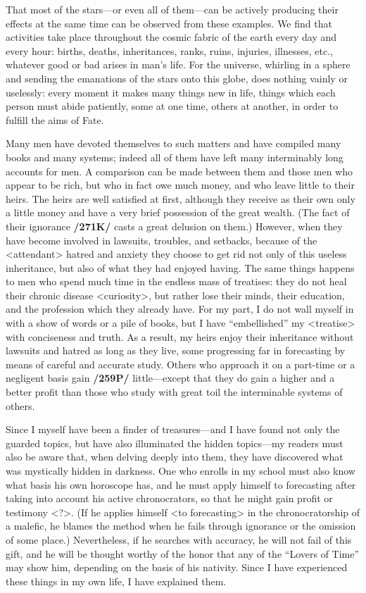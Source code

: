 That most of the stars—or even all of them—can be actively producing their effects at the same time can be observed from these examples. We find that activities take place throughout the cosmic fabric of the
earth every day and every hour: births, deaths, inheritances, ranks, ruins, injuries, illnesses, etc., whatever good or bad arises in man’s life. For the universe, whirling in a sphere and sending the emanations of the stars onto this globe, does nothing vainly or uselessly: every moment it makes many things new in life, things which each person must abide patiently, some at one time, others at another, in order to fulfill the aims of Fate.

Many men have devoted themselves to such matters and have compiled many books and many systems; indeed all of them have left many interminably long accounts for men. A comparison can be
made between them and those men who appear to be rich, but who in fact owe much money, and who leave little to their heirs. The heirs are well satisfied at first, although they receive as their own only a little money and have a very brief possession of the great wealth. (The fact of their ignorance \textbf{/271K/} casts a great delusion on them.) However, when they have become involved in lawsuits, troubles, and setbacks, because of the <attendant> hatred and anxiety they choose to get rid not only of this useless inheritance,
but also of what they had enjoyed having. The same things happens to men who spend much time in the endless mass of treatises: they do not heal their chronic disease <curiosity>, but rather lose their minds, their education, and the profession which they already have.
For my part, I do not wall myself in with a show of words or a pile of books, but I have “embellished” my <treatise> with conciseness and truth. As a result, my heirs enjoy their inheritance without lawsuits and hatred as long as they live, some progressing far in forecasting by means of careful and accurate study. Others who approach it on a part-time or a negligent basis gain \textbf{/259P/} little—except that
they do gain a higher and a better profit than those who study with great toil the interminable systems of others.

Since I myself have been a finder of treasures—and I have found not only the guarded topics, but have also illuminated the hidden topics—my readers must also be aware that, when delving deeply into them,
they have discovered what was mystically hidden in darkness. One who enrolls in my school must also know what basis his own horoscope has, and he must apply himself to forecasting after taking into account
his active chronocrators, so that he might gain profit or testimony <?>. (If he applies himself <to forecasting> in the chronocratorship of a malefic, he blames the method when he fails through ignorance or the omission of some place.) Nevertheless, if he searches with accuracy, he will not fail of this gift, and he will be thought worthy of the honor that any of the “Lovers of Time” may show him, depending on the basis of his nativity. Since I have experienced these things in my own life, I have explained them.

